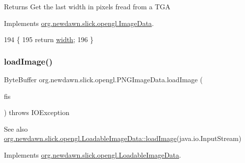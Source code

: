\begin{DoxyReturn}{Returns}
Get the last width in pixels fread from a T\+GA 
\end{DoxyReturn}


Implements \mbox{\hyperlink{interfaceorg_1_1newdawn_1_1slick_1_1opengl_1_1_image_data_a59fd53f0ca1e501de35c1b2b4a7e69c5}{org.\+newdawn.\+slick.\+opengl.\+Image\+Data}}.


\begin{DoxyCode}
194                           \{
195         \textcolor{keywordflow}{return} \mbox{\hyperlink{classorg_1_1newdawn_1_1slick_1_1opengl_1_1_p_n_g_image_data_a2f5956db335a1e779f14e4b06468ec5b}{width}};
196     \}
\end{DoxyCode}
\mbox{\label{classorg_1_1newdawn_1_1slick_1_1opengl_1_1_p_n_g_image_data_ad5507c5228d071b2936b8aa91f18e9e1}} 
\subsubsection{\texorpdfstring{load\+Image()}{loadImage()}\hspace{0.1cm}{\footnotesize\ttfamily [1/3]}}
{\footnotesize\ttfamily Byte\+Buffer org.\+newdawn.\+slick.\+opengl.\+P\+N\+G\+Image\+Data.\+load\+Image (\begin{DoxyParamCaption}\item[{Input\+Stream}]{fis }\end{DoxyParamCaption}) throws I\+O\+Exception\hspace{0.3cm}{\ttfamily [inline]}}

\begin{DoxySeeAlso}{See also}
\mbox{\hyperlink{interfaceorg_1_1newdawn_1_1slick_1_1opengl_1_1_loadable_image_data_a640021b955dde7deeeeabb5ac3738d2b}{org.\+newdawn.\+slick.\+opengl.\+Loadable\+Image\+Data\+::load\+Image}}(java.\+io.\+Input\+Stream) 
\end{DoxySeeAlso}


Implements \mbox{\hyperlink{interfaceorg_1_1newdawn_1_1slick_1_1opengl_1_1_loadable_image_data_a640021b955dde7deeeeabb5ac3738d2b}{org.\+newdawn.\+slick.\+opengl.\+Loadable\+Image\+Data}}.


